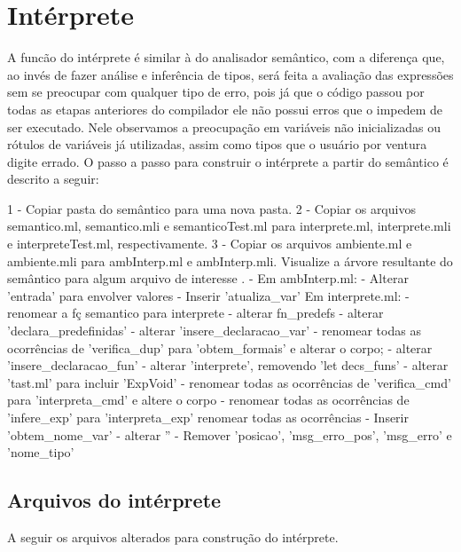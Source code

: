 \documentclass[12pt,a4paper,twoside]{report}
\begin{document}
\chapter{Intérprete}
A funcão do intérprete é similar à do analisador semântico, com a diferença que, ao invés de fazer análise e inferência de tipos, será
feita a avaliação das expressões sem se preocupar com qualquer tipo de erro, pois já que
o código passou por todas as etapas anteriores do compilador ele não possui erros que o
impedem de ser executado. Nele observamos a preocupação em variáveis não inicializadas ou rótulos de variáveis já utilizadas, assim como tipos que o usuário por ventura digite errado.
O passo a passo para construir o intérprete a partir do semântico é descrito a seguir:
 \begin{terminal}
1 - Copiar pasta do semântico para uma nova pasta.
2 - Copiar os arquivos semantico.ml, semantico.mli e semanticoTest.ml para
interprete.ml, interprete.mli e interpreteTest.ml, respectivamente.
3 - Copiar os arquivos ambiente.ml e ambiente.mli para ambInterp.ml e
ambInterp.mli.
Visualize a árvore resultante do semântico para algum arquivo de interesse
.
- Em ambInterp.ml:
- Alterar 'entrada' para envolver valores
- Inserir 'atualiza_var'
Em interprete.ml:
- renomear a fç semantico para interprete
- alterar fn_predefs
- alterar 'declara_predefinidas'
- alterar 'insere_declaracao_var'
- renomear todas as ocorrências de 'verifica_dup' para 'obtem_formais' e
alterar o corpo;
- alterar 'insere_declaracao_fun'
- alterar 'interprete', removendo 'let decs_funs'
- alterar 'tast.ml' para incluir 'ExpVoid'
- renomear todas as ocorrências de 'verifica_cmd' para 'interpreta_cmd'
e altere o corpo
- renomear todas as ocorrências de 'infere_exp' para 'interpreta_exp'
renomear todas as ocorrências
- Inserir 'obtem_nome_var'
- alterar ''
- Remover 'posicao', 'msg_erro_pos', 'msg_erro' e 'nome_tipo'
\end{terminal}

\section{Arquivos do intérprete}
A seguir os arquivos alterados para construção do intérprete.
\end{document}
